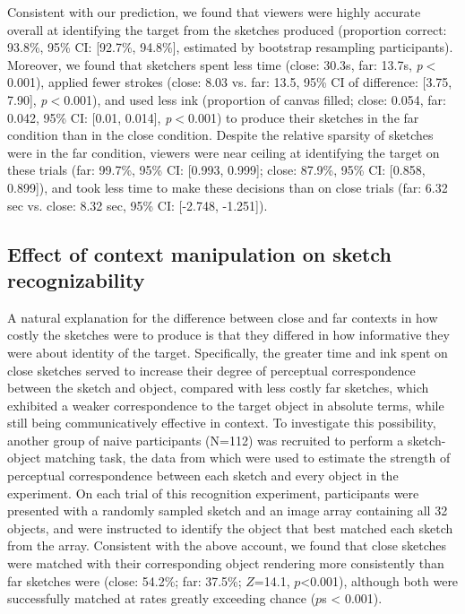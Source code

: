 \documentclass[9pt,twocolumn,twoside]{pnas-new}
\begin{document}

Consistent with our prediction, we found that viewers were highly accurate overall at identifying the target from the sketches produced (proportion correct: 93.8\%, 95\% CI: [92.7\%, 94.8\%], estimated by bootstrap resampling participants). 
Moreover, we found that sketchers spent less time (close: 30.3s, far: 13.7s, \textit{p}$<$0.001), applied fewer strokes (close: 8.03 vs. far: 13.5, 95\% CI of difference: [3.75, 7.90], \textit{p}$<$0.001), and used less ink (proportion of canvas filled; close: 0.054, far: 0.042, 95\% CI: [0.01, 0.014], \textit{p}$<$0.001) to produce their sketches in the far condition than in the close condition. 
Despite the relative sparsity of sketches were in the far condition, viewers were near ceiling at identifying the target on these trials (far: 99.7\%, 95\% CI: [0.993, 0.999]; close: 87.9\%, 95\% CI: [0.858, 0.899]), and took less time to make these decisions than on close trials (far: 6.32 sec vs. close: 8.32 sec, 95\% CI: [-2.748, -1.251]).

\subsection*{Effect of context manipulation on sketch recognizability}

A natural explanation for the difference between close and far contexts in how costly the sketches were to produce is that they differed in how informative they were about identity of the target. Specifically, the greater time and ink spent on close sketches served to increase their degree of perceptual correspondence between the sketch and object, compared with less costly far sketches, which exhibited a weaker correspondence to the target object in absolute terms, while still being communicatively effective in context. 
To investigate this possibility, another group of naive participants (N=112) was recruited to perform a sketch-object matching task, the data from which were used to estimate the strength of perceptual correspondence between each sketch and every object in the experiment. 
On each trial of this recognition experiment, participants were presented with a randomly sampled sketch and an image array containing all 32 objects, and were instructed to identify the object that best matched each sketch from the array. 
Consistent with the above account, we found that close sketches were matched with their corresponding object rendering more consistently than far sketches were (close: 54.2\%; far: 37.5\%; $Z$=14.1, $p$<0.001), although both were successfully matched at rates greatly exceeding chance ($p$s < 0.001).
\end{document}
